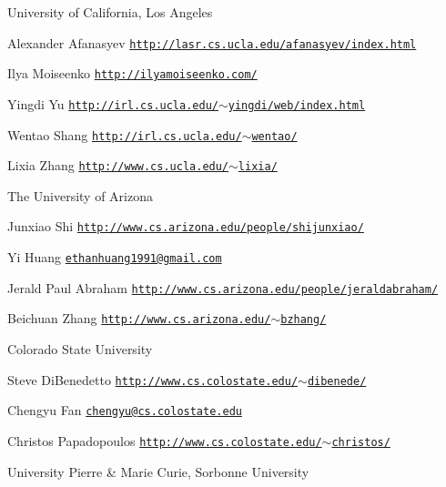 \begin{DoxyItemize}
\item University of California, Los Angeles
\begin{DoxyItemize}
\item Alexander Afanasyev \href{http://lasr.cs.ucla.edu/afanasyev/index.html}{\tt http\+://lasr.\+cs.\+ucla.\+edu/afanasyev/index.\+html}
\item Ilya Moiseenko \href{http://ilyamoiseenko.com/}{\tt http\+://ilyamoiseenko.\+com/}
\item Yingdi Yu \href{http://irl.cs.ucla.edu/~yingdi/web/index.html}{\tt http\+://irl.\+cs.\+ucla.\+edu/$\sim$yingdi/web/index.\+html}
\item Wentao Shang \href{http://irl.cs.ucla.edu/~wentao/}{\tt http\+://irl.\+cs.\+ucla.\+edu/$\sim$wentao/}
\item Lixia Zhang \href{http://www.cs.ucla.edu/~lixia/}{\tt http\+://www.\+cs.\+ucla.\+edu/$\sim$lixia/}
\end{DoxyItemize}
\item The University of Arizona
\begin{DoxyItemize}
\item Junxiao Shi \href{http://www.cs.arizona.edu/people/shijunxiao/}{\tt http\+://www.\+cs.\+arizona.\+edu/people/shijunxiao/}
\item Yi Huang \href{mailto:ethanhuang1991@gmail.com}{\tt ethanhuang1991@gmail.\+com}
\item Jerald Paul Abraham \href{http://www.cs.arizona.edu/people/jeraldabraham/}{\tt http\+://www.\+cs.\+arizona.\+edu/people/jeraldabraham/}
\item Beichuan Zhang \href{http://www.cs.arizona.edu/~bzhang/}{\tt http\+://www.\+cs.\+arizona.\+edu/$\sim$bzhang/}
\end{DoxyItemize}
\item Colorado State University
\begin{DoxyItemize}
\item Steve Di\+Benedetto \href{http://www.cs.colostate.edu/~dibenede/}{\tt http\+://www.\+cs.\+colostate.\+edu/$\sim$dibenede/}
\item Chengyu Fan \href{mailto:chengyu@cs.colostate.edu}{\tt chengyu@cs.\+colostate.\+edu}
\item Christos Papadopoulos \href{http://www.cs.colostate.edu/~christos/}{\tt http\+://www.\+cs.\+colostate.\+edu/$\sim$christos/}
\end{DoxyItemize}
\item University Pierre \& Marie Curie, Sorbonne University

\end{DoxyItemize}
